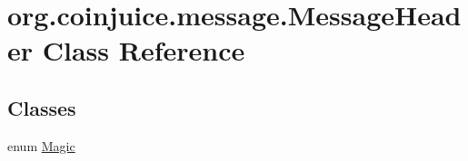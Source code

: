 \hypertarget{classorg_1_1coinjuice_1_1message_1_1_message_header}{\section{org.\-coinjuice.\-message.\-Message\-Header Class Reference}
\label{classorg_1_1coinjuice_1_1message_1_1_message_header}
}
\subsection*{Classes}
\begin{DoxyCompactItemize}
\item 
enum \hyperlink{enumorg_1_1coinjuice_1_1message_1_1_message_header_1_1_magic}{Magic}
\end{DoxyCompactItemize}
